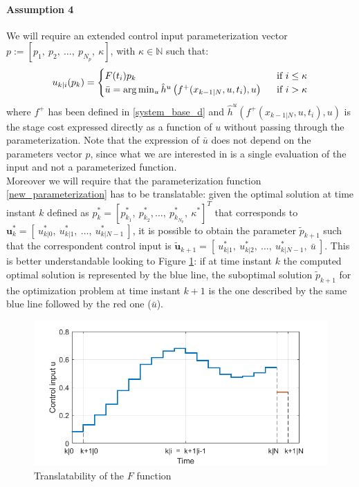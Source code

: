 \paragraph{Assumption 4}
We will require an extended control input parameterization vector $p:=[p_1,\ p_2,\ \dots,\ p_{N_p},\ \kappa]$, with $\kappa\in\mathbb{N}$ such that: 
\begin{equation}
\begin{split}\label{new_parameterization}
    u_{k|i}(p_k)=
        \begin{cases}
            F(t_i){p_k}\ \ \ \ \   &\textnormal{if } i\le\kappa \\
            \bar{u}=\arg \min_u \hat{h}^u\left(f^+(x_{k-1|N},u,t_i),u\right)\ \ &\textnormal{if } i> \kappa
        \end{cases}
    \end{split}
\end{equation} 
where $f^+$ has been defined in \ref{system_base_d} and $\hat{h}^u\left(f^+(x_{k-1|N},u,t_i),u\right)$ is the stage cost expressed directly as a function of $u$ without passing through the parameterization. Note that the expression of $\bar{u}$ does not depend on the parameters vector $p$, since what we are interested in is a single evaluation of the input and not a parameterized function.\\
Moreover we will require that the parameterization function \ref{new_parameterization} has to be translatable: given the optimal solution at time instant $k$ defined as $p_k^*=\left[ p_{k_1}^*,\ p_{k_2}^*,  \dots,\ p_{k_{N_p}}^*,\ \kappa^* \right]^T$ that corresponds to $  \textbf{u}_k^*=[\ u_{k|0}^*,\ u_{k|1}^*,\  \dots,\  u_{k|{N-1}}^*\ ]$, it is possible to obtain the parameter $\tilde{p}_{k+1}$ such that the correspondent control input is $  \tilde{\textbf{u}}_{k+1}=[\ u_{k|1}^*,\ u_{k|2}^*,\  \dots,\  u_{k|{N-1}}^*,\ \bar{u} \ ]$. This is better understandable looking to Figure \ref{param_translatability}: if at time instant $k$ the computed optimal solution is represented by the blue line, the suboptimal solution $\tilde{p}_{k+1}$ for the optimization problem at time instant $k+1$ is the one described by the same blue line followed by the red one ($\bar{u}$).
\begin{figure}[h!]
	\centering
	\includegraphics[scale=0.6]{IMMAGINI/trans_u.png}
	\caption{Translatability of the $F$ function}
	\label{param_translatability}
\end{figure}

